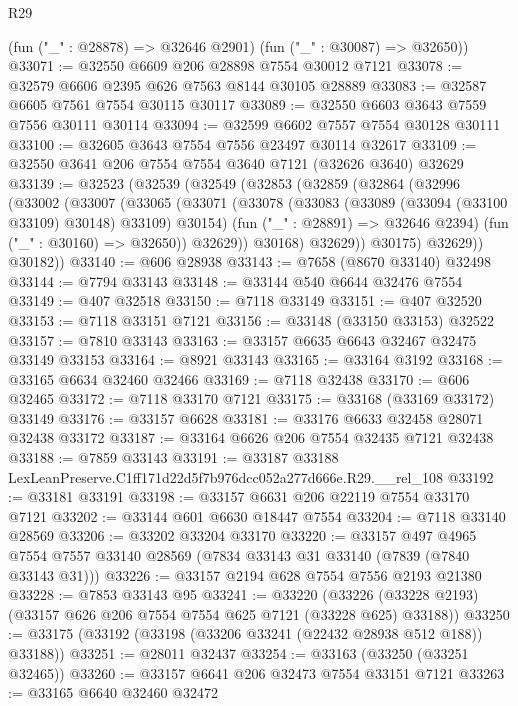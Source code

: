 \begin{lexlean}{R29}
\begin{coremodule}
      (fun ("_" : @28878) => @32646 @2901)
      (fun ("_" : @30087) => @32650))
@33071 := @32550 @6609 @206 @28898 @7554 @30012 @7121
@33078 := @32579 @6606 @2395 @626 @7563 @8144 @30105 @28889
@33083 := @32587 @6605 @7561 @7554 @30115 @30117
@33089 := @32550 @6603 @3643 @7559 @7556 @30111 @30114
@33094 := @32599 @6602 @7557 @7554 @30128 @30111
@33100 := @32605 @3643 @7554 @7556 @23497 @30114 @32617
@33109 := @32550 @3641 @206 @7554 @7554 @3640 @7121 (@32626 @3640) @32629
@33139 := @32523
    (@32539
      (@32549
        (@32853
          (@32859
            (@32864
              (@32996
                (@33002
                  (@33007
                    (@33065
                      (@33071
                        (@33078
                          (@33083 (@33089 (@33094 (@33100 @33109) @30148) @33109) @30154)
                          (fun ("_" : @28891) => @32646 @2394)
                          (fun ("_" : @30160) => @32650))
                        @32629))
                    @30168)
                  @32629))
              @30175)
            @32629))
        @30182))
@33140 := @606 @28938
@33143 := @7658 (@8670 @33140) @32498
@33144 := @7794 @33143
@33148 := @33144 @540 @6644 @32476 @7554
@33149 := @407 @32518
@33150 := @7118 @33149
@33151 := @407 @32520
@33153 := @7118 @33151 @7121
@33156 := @33148 (@33150 @33153) @32522
@33157 := @7810 @33143
@33163 := @33157 @6635 @6643 @32467 @32475 @33149 @33153
@33164 := @8921 @33143
@33165 := @33164 @3192
@33168 := @33165 @6634 @32460 @32466
@33169 := @7118 @32438
@33170 := @606 @32465
@33172 := @7118 @33170 @7121
@33175 := @33168 (@33169 @33172) @33149
@33176 := @33157 @6628
@33181 := @33176 @6633 @32458 @28071 @32438 @33172
@33187 := @33164 @6626 @206 @7554 @32435 @7121 @32438
@33188 := @7859 @33143
@33191 := @33187 @33188 LexLeanPreserve.C1ff171d22d5f7b976dcc052a277d666e.R29.__rel_108
@33192 := @33181 @33191
@33198 := @33157 @6631 @206 @22119 @7554 @33170 @7121
@33202 := @33144 @601 @6630 @18447 @7554
@33204 := @7118 @33140 @28569
@33206 := @33202 @33204 @33170
@33220 := @33157
    @497
    @4965
    @7554
    @7557
    @33140
    @28569
    (@7834 @33143 @31 @33140 (@7839 (@7840 @33143 @31)))
@33226 := @33157 @2194 @628 @7554 @7556 @2193 @21380
@33228 := @7853 @33143 @95
@33241 := @33220
    (@33226 (@33228 @2193) (@33157 @626 @206 @7554 @7554 @625 @7121 (@33228 @625) @33188))
@33250 := @33175 (@33192 (@33198 (@33206 @33241 (@22432 @28938 @512 @188)) @33188))
@33251 := @28011 @32437
@33254 := @33163 (@33250 (@33251 @32465))
@33260 := @33157 @6641 @206 @32473 @7554 @33151 @7121
@33263 := @33165 @6640 @32460 @32472

\end{coremodule}
\end{lexlean}
